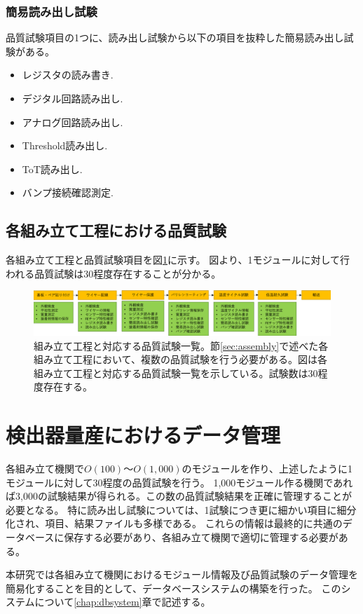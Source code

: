 \clearpage
\subsubsection{簡易読み出し試験}
品質試験項目の1つに、読み出し試験から以下の項目を抜粋した簡易読み出し試験がある。
\begin{itemize}
  \item レジスタの読み書き.
  \item デジタル回路読み出し.
  \item アナログ回路読み出し.
  \item Threshold読み出し.
  \item ToT読み出し.
  \item バンプ接続確認測定.
\end{itemize}

\subsection{各組み立て工程における品質試験}

各組み立て工程と品質試験項目を図\ref{stage_test_flow}に示す。
図より、1モジュールに対して行われる品質試験は30程度存在することが分かる。

\begin{figure}[bpt]\centering
\includegraphics[width=15cm]{./stage_test_flow.png}
\caption[組み立て工程と対応する品質試験一覧]{組み立て工程と対応する品質試験一覧。節\ref{sec:assembly}で述べた各組み立て工程において、複数の品質試験を行う必要がある。図は各組み立て工程と対応する品質試験一覧を示している。試験数は30程度存在する。}
\label{stage_test_flow}
\end{figure}

\section{検出器量産におけるデータ管理}
各組み立て機関で$O(100)〜O(1,000)$のモジュールを作り、上述したように1モジュールに対して30程度の品質試験を行う。
1,000モジュール作る機関であれば3,000の試験結果が得られる。この数の品質試験結果を正確に管理することが必要となる。
特に読み出し試験については、1試験につき更に細かい項目に細分化され、項目、結果ファイルも多様である。
これらの情報は最終的に共通のデータベースに保存する必要があり、各組み立て機関で適切に管理する必要がある。

本研究では各組み立て機関におけるモジュール情報及び品質試験のデータ管理を簡易化することを目的として、データベースシステムの構築を行った。
このシステムについて\ref{chap:dbsystem}章で記述する。

